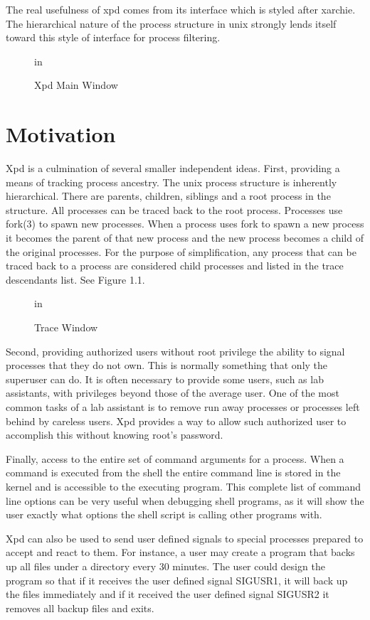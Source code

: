 The real usefulness of xpd comes from its interface which is styled after xarchie.
The hierarchical nature of the process structure in unix strongly lends itself toward this style of interface for process filtering.

\begin{figure}[h]
    in
   \caption{Xpd Main Window}
\end{figure}


\chapter{Motivation}
Xpd is a culmination of several smaller independent ideas.
First, providing a means of tracking process ancestry.
The unix process structure is inherently hierarchical.
There are parents, children, siblings and a root process in the structure.
All processes can be traced back to the root process.
Processes use fork(3) to spawn new processes.
When a process uses fork to spawn a new process it becomes the parent of that new process and the new process becomes a child of the original processes.
For the purpose of simplification, any process that can be traced back to a process are considered child processes and listed in the trace descendants list.
See Figure 1.1.

\begin{figure}
    in
   \caption{Trace Window}
\end{figure}


Second, providing authorized users without root privilege the ability to signal processes that they do not own.
This is normally something that only the superuser can do.
It is often necessary to provide some users, such as lab assistants, with privileges beyond those of the average user.
One of the most common tasks of a lab assistant is to remove run away processes or processes left behind by careless users.
Xpd provides a way to allow such authorized user to accomplish this without knowing root's password.

Finally, access to the entire set of command arguments for a process.
When a command is executed from the shell the entire command line is stored in the kernel and is accessible to the executing program.
This complete list of command line options can be very useful when debugging shell programs, as it will show the user exactly what options the shell script is calling other programs with.

Xpd can also be used to send user defined signals to special processes prepared to accept and react to them.
For instance, a user may create a program that backs up all files under a directory every 30 minutes.
The user could design the program so that if it receives the user defined signal SIGUSR1, it will back up the files immediately and if it received the user defined signal SIGUSR2 it removes all backup files and exits.

